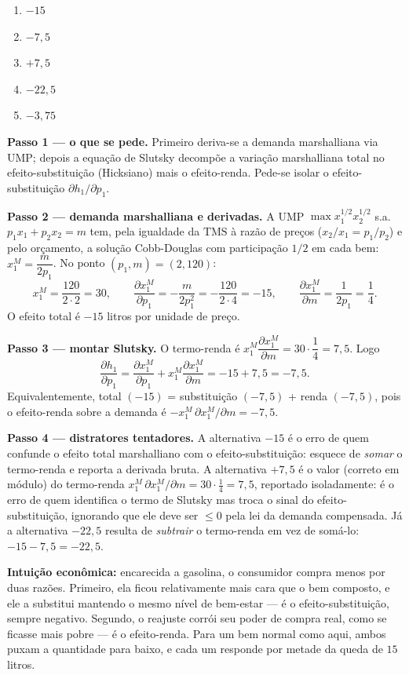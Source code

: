 \begin{enumerate}[label=\Alph*., leftmargin=3.2em, itemsep=0.15em, topsep=0.2em]
  \item $-15$
  \item $-7{,}5$
  \item $+7{,}5$
  \item $-22{,}5$
  \item $-3{,}75$
\end{enumerate}
\begin{solucao}
\textbf{Passo 1 — o que se pede.} Primeiro deriva-se a demanda marshalliana via UMP; depois a equação de Slutsky decompõe a variação marshalliana total no efeito-substituição (Hicksiano) mais o efeito-renda. Pede-se isolar o efeito-substituição $\partial h_1/\partial p_1$.

\textbf{Passo 2 — demanda marshalliana e derivadas.} A UMP $\max x_1^{1/2}x_2^{1/2}$ s.a. $p_1 x_1+p_2 x_2=m$ tem, pela igualdade da $\text{TMS}$ à razão de preços ($x_2/x_1=p_1/p_2$) e pelo orçamento, a solução Cobb-Douglas com participação $1/2$ em cada bem: $x_1^{M}=\dfrac{m}{2p_1}$. No ponto $(p_1,m)=(2,120)$:
\[
x_1^{M}=\frac{120}{2\cdot 2}=30,\qquad \frac{\partial x_1^{M}}{\partial p_1}=-\frac{m}{2p_1^{2}}=-\frac{120}{2\cdot 4}=-15,\qquad \frac{\partial x_1^{M}}{\partial m}=\frac{1}{2p_1}=\frac{1}{4}.
\]
O efeito total é $-15$ litros por unidade de preço.

\textbf{Passo 3 — montar Slutsky.} O termo-renda é $x_1^{M}\dfrac{\partial x_1^{M}}{\partial m}=30\cdot\dfrac14=7{,}5$. Logo
\[
\frac{\partial h_1}{\partial p_1}=\frac{\partial x_1^{M}}{\partial p_1}+x_1^{M}\frac{\partial x_1^{M}}{\partial m}=-15+7{,}5=-7{,}5.
\]
Equivalentemente, total $(-15)$ = substituição $(-7{,}5)$ + renda $(-7{,}5)$, pois o efeito-renda sobre a demanda é $-x_1^{M}\,\partial x_1^{M}/\partial m=-7{,}5$.

\textbf{Passo 4 — distratores tentadores.} A alternativa $-15$ é o erro de quem confunde o efeito total marshalliano com o efeito-substituição: esquece de \emph{somar} o termo-renda e reporta a derivada bruta. A alternativa $+7{,}5$ é o valor (correto em módulo) do termo-renda $x_1^{M}\,\partial x_1^{M}/\partial m=30\cdot\tfrac14=7{,}5$, reportado isoladamente: é o erro de quem identifica o termo de Slutsky mas troca o sinal do efeito-substituição, ignorando que ele deve ser $\le 0$ pela lei da demanda compensada. Já a alternativa $-22{,}5$ resulta de \emph{subtrair} o termo-renda em vez de somá-lo: $-15-7{,}5=-22{,}5$.

\textbf{Intuição econômica:} encarecida a gasolina, o consumidor compra menos por duas razões. Primeiro, ela ficou relativamente mais cara que o bem composto, e ele a substitui mantendo o mesmo nível de bem-estar — é o efeito-substituição, sempre negativo. Segundo, o reajuste corrói seu poder de compra real, como se ficasse mais pobre — é o efeito-renda. Para um bem normal como aqui, ambos puxam a quantidade para baixo, e cada um responde por metade da queda de $15$ litros.
\end{solucao}

